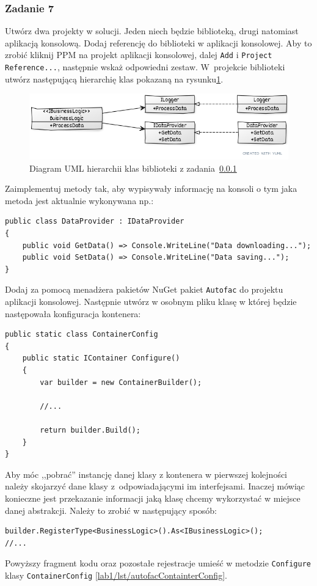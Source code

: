 \subsubsection{Zadanie 7}\label{lab1/ex/IoC}
Utwórz dwa projekty w solucji. Jeden niech będzie biblioteką, drugi natomiast aplikacją konsolową. Dodaj referencję do biblioteki w aplikacji konsolowej. Aby to zrobić kliknij PPM na projekt aplikacji konsolowej, dalej \texttt{Add} i \texttt{Project Reference...}, następnie wskaż odpowiedni zestaw. W~projekcie biblioteki utwórz następującą hierarchię klas pokazaną na rysunku\ref{lab1/fig/IoC}.
\begin{figure}[hbt!]
	\centering
	\includegraphics[width=0.8\linewidth]{images/ExerciseIocLib}
	\caption{Diagram UML hierarchii klas biblioteki z zadania~\ref{lab1/ex/IoC}}
	\label{lab1/fig/IoC}
\end{figure}

%

Zaimplementuj metody tak, aby wypisywały informację na konsoli o tym jaka metoda jest aktualnie wykonywana np.:
\begin{lstlisting}
public class DataProvider : IDataProvider
{
	public void GetData() => Console.WriteLine("Data downloading...");
	public void SetData() => Console.WriteLine("Data saving...");
}
\end{lstlisting}

Dodaj za pomocą menadżera pakietów NuGet pakiet \texttt{Autofac} do projektu aplikacji konsolowej.
Następnie utwórz w osobnym pliku klasę w której będzie następowała konfiguracja kontenera:
\begin{lstlisting}[caption={Konfiguracja kontenera IoC}, label={lab1/lst/autofacContainterConfig}]
public static class ContainerConfig
{
	public static IContainer Configure()
	{
		var builder = new ContainerBuilder();
		
		//...
		
		return builder.Build();
	}
}
\end{lstlisting}
Aby móc ,,pobrać'' instancję danej klasy z kontenera w pierwszej kolejności należy skojarzyć dane klasy z~odpowiadającymi im interfejsami. Inaczej mówiąc konieczne jest przekazanie informacji jaką klasę chcemy wykorzystać w miejsce danej abstrakcji. Należy to zrobić w następujący sposób:
\begin{lstlisting}
builder.RegisterType<BusinessLogic>().As<IBusinessLogic>();
//...
\end{lstlisting}
Powyższy fragment kodu oraz pozostałe rejestracje umieść w metodzie \texttt{Configure} klasy \texttt{ContainerConfig} \ref{lab1/lst/autofacContainterConfig}.

